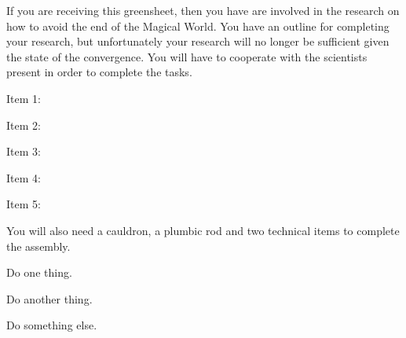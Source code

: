 \documentclass[green]{guildcamp3}
\begin{document}
\name{\gSaveTheWorldMages{}}






If you are receiving this greensheet, then you have are involved in the research on how to avoid the end of the Magical World. You have an outline for completing your research, but unfortunately your research will no longer be sufficient given the state of the convergence. You will have to cooperate with the scientists present in order to complete the tasks. 

Item 1:

Item 2:

Item 3:

Item 4:

Item 5: 

You will also need a cauldron, a plumbic rod and two technical items to complete the assembly. 


\begin{enum}[Directions]
  \item Do one thing.
  \item Do another thing.
  \item Do something else.
\end{enum}
\end{document}
